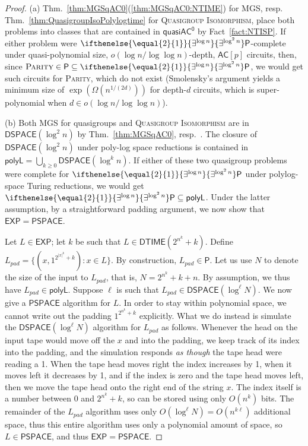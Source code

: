 \documentclass{theoretics}
\newcommand{\algprobm}[1]{\textsc{#1}\xspace}
\newcommand{\betacc}[1]{\ifthenelse{\equal{#1}{1}}{\exists^{\log n}}{\exists^{\log^{#1}n}}} %
\newcommand{\Thm}[1]{Thm.~\ref{#1}\xspace}
\newcommand*{\ComplexityClass}[1]{\ensuremath{\mathsf{#1}}\xspace}
\renewcommand{\P}{\ComplexityClass{P}}
\newcommand*{\EXP}{\ComplexityClass{EXP}}
\newcommand*{\PSPACE}{\ComplexityClass{PSPACE}}
\newcommand{\qACz}{\ComplexityClass{quasiAC^0}}
\newcommand{\DTIME}{\ComplexityClass{DTIME}}
\begin{document}
\begin{proof}
(a) \Thm{thm:MGSqAC0}(\ref{thm:MGSqAC0:NTIME}) for \algprobm{MGS}, resp. \Thm{thm:QuasigroupIsoPolylogtime} for \algprobm{Quasigroup Isomorphism}, place both problems into classes that are contained in $\qACz$ by Fact~\ref{fact:NTISP}. If either problem were $\betacc{2}\P$-complete under quasi-polynomial size, $o(\log n / \log \log n)$-depth, $\mathsf{AC}[p]$ circuits, then, since $\algprobm{Parity} \in \P \subseteq \betacc{2}\P$, we would get such circuits for \algprobm{Parity}, which do not exist \cite{Razborov, Smolensky87algebraicmethods}  (Smolensky's argument yields a minimum size of $\exp(\Omega(n^{1/(2d)}))$ for depth-$d$ circuits, which is super-polynomial when $d \in o(\log n / \log \log n)$). 

(b) Both \algprobm{MGS} for quasigroups and \algprobm{Quasigroup Isomorphism} are in $\mathsf{DSPACE}(\log^2 n)$ by \Thm{thm:MGSqAC0}, resp.\ \cite{ChattopadhyayToranWagner}. The closure of $\mathsf{DSPACE}(\log^2 n)$ under poly-log space reductions is contained in $\mathsf{polyL} = \bigcup_{k \geq 0} \mathsf{DSPACE}(\log^k n)$. If either of these two quasigroup problems were complete for $\betacc{2} \P$ under polylog-space Turing reductions, we would get $\betacc{2} \P \subseteq \mathsf{polyL}$. Under the latter assumption, by a straightforward padding argument, we now show that $\EXP = \PSPACE$.

Let $L \in \EXP$; let $k$ be such that $L \in \DTIME(2^{n^k}+k)$. Define $L_{pad} = \{(x,1^{2^{|x|^k}+k}) : x \in L\}$. By construction, $L_{pad} \in \P$. Let us use $N$ to denote the size of the input to $L_{pad}$, that is, $N = 2^{n^k}+k+n$. By assumption, we thus have $L_{pad} \in \mathsf{polyL}$. Suppose $\ell$ is such that $L_{pad} \in \mathsf{DSPACE}(\log^\ell N)$. We now give a $\PSPACE$ algorithm for $L$. In order to stay within polynomial space, we cannot write out the padding $1^{2^{n^k}+k}$ explicitly. What we do instead is simulate the $\mathsf{DSPACE}(\log^\ell N)$ algorithm for $L_{pad}$ as follows. Whenever the head on the input tape would move off the $x$ and into the padding, we keep track of its index into the padding, and the simulation responds \emph{as though} the tape head were reading a 1. When the tape head moves right the index increases by 1, when it moves left it decreases by 1, and if the index is zero and the tape head moves left, then we move the tape head onto the right end of the string $x$. The index itself is a number between $0$ and $2^{n^k}+k$, so can be stored using only $O(n^k)$ bits. The remainder of the $L_{pad}$ algorithm uses only $O(\log^\ell N) = O(n^{k\ell})$ additional space, thus this entire algorithm uses only a polynomial amount of space, so $L \in \PSPACE$, and thus $\EXP=\PSPACE$.
\end{proof}
\end{document}
